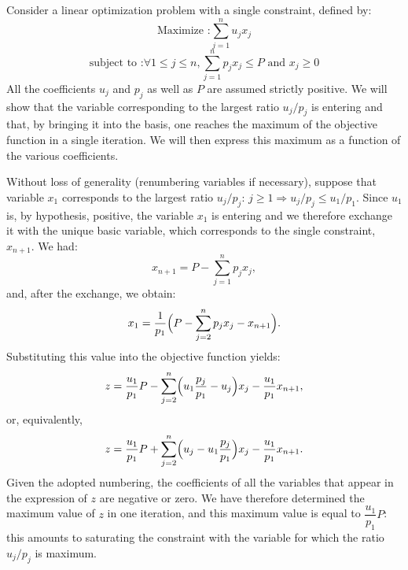 \begin{example}
    Consider a linear optimization problem with a single constraint, defined by:
    \[
        \text{Maximize :} \sum_{j=1}^n u_j x_j
    \]
    \[
        \text{subject to :} \forall 1\le j \le n, \sum_{j=1}^n p_j x_j \leqslant P \text{ and } x_j \geqslant 0
    \]
    All the coefficients \(u_j\) and \(p_j\) as well as \(P\) are assumed strictly positive. We will show that the variable corresponding to the largest ratio \(u_j/p_j\) is entering and that, by bringing it into the basis, one reaches the maximum of the objective function in a single iteration. We will then express this maximum as a function of the various coefficients.

    Without loss of generality (renumbering variables if necessary), suppose that variable \(x_1\) corresponds to the largest ratio \(u_j/p_j\): \(j\ge 1 \Rightarrow u_j/p_j \le u_1/p_1\). Since \(u_1\) is, by hypothesis, positive, the variable \(x_1\) is entering and we therefore exchange it with the unique basic variable, which corresponds to the single constraint, \(x_{n+1}\). We had:
    \[
    x_{n+1} = P - \sum_{j=1}^n p_j x_j,
    \]
    and, after the exchange, we obtain:
    \[
    x_1 = \frac{1}{p_1}\Bigl(P - \sum_{j=2}^n p_j x_j - x_{n+1}\Bigr).
    \]
    Substituting this value into the objective function yields:
    \[
    z = \frac{u_1}{p_1}P - \sum_{j=2}^n\Bigl(u_1\frac{p_j}{p_1} - u_j\Bigr)x_j - \frac{u_1}{p_1}x_{n+1},
    \]
    or, equivalently,
    \[
    z = \frac{u_1}{p_1}P + \sum_{j=2}^n\Bigl(u_j - u_1\frac{p_j}{p_1}\Bigr)x_j - \frac{u_1}{p_1}x_{n+1}.
    \]
    Given the adopted numbering, the coefficients of all the variables that appear in the expression of \(z\) are negative or zero. We have therefore determined the maximum value of \(z\) in one iteration, and this maximum value is equal to \(\dfrac{u_1}{p_1}P\): this amounts to saturating the constraint with the variable for which the ratio \(u_j/p_j\) is maximum.
\end{example}

